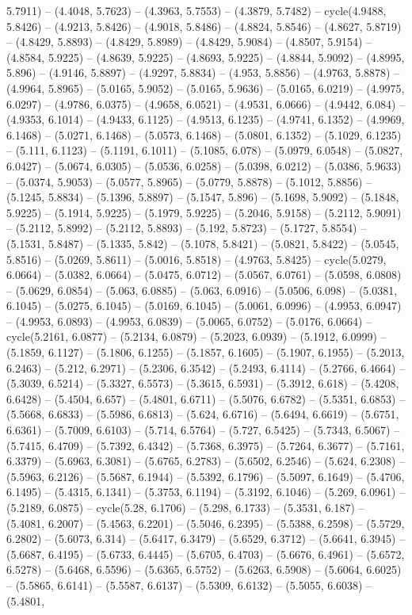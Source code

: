 5.7911) -- (4.4048, 5.7623) -- (4.3963, 5.7553) -- (4.3879, 5.7482) -- cycle(4.9488, 5.8426) -- (4.9213, 5.8426) -- (4.9018, 5.8486) -- (4.8824, 5.8546) -- (4.8627, 5.8719) -- (4.8429, 5.8893) -- (4.8429, 5.8989) -- (4.8429, 5.9084) -- (4.8507, 5.9154) -- (4.8584, 5.9225) -- (4.8639, 5.9225) -- (4.8693, 5.9225) -- (4.8844, 5.9092) -- (4.8995, 5.896) -- (4.9146, 5.8897) -- (4.9297, 5.8834) -- (4.953, 5.8856) -- (4.9763, 5.8878) -- (4.9964, 5.8965) -- (5.0165, 5.9052) -- (5.0165, 5.9636) -- (5.0165, 6.0219) -- (4.9975, 6.0297) -- (4.9786, 6.0375) -- (4.9658, 6.0521) -- (4.9531, 6.0666) -- (4.9442, 6.084) -- (4.9353, 6.1014) -- (4.9433, 6.1125) -- (4.9513, 6.1235) -- (4.9741, 6.1352) -- (4.9969, 6.1468) -- (5.0271, 6.1468) -- (5.0573, 6.1468) -- (5.0801, 6.1352) -- (5.1029, 6.1235) -- (5.111, 6.1123) -- (5.1191, 6.1011) -- (5.1085, 6.078) -- (5.0979, 6.0548) -- (5.0827, 6.0427) -- (5.0674, 6.0305) -- (5.0536, 6.0258) -- (5.0398, 6.0212) -- (5.0386, 5.9633) -- (5.0374, 5.9053) -- (5.0577, 5.8965) -- (5.0779, 5.8878) -- (5.1012, 5.8856) -- (5.1245, 5.8834) -- (5.1396, 5.8897) -- (5.1547, 5.896) -- (5.1698, 5.9092) -- (5.1848, 5.9225) -- (5.1914, 5.9225) -- (5.1979, 5.9225) -- (5.2046, 5.9158) -- (5.2112, 5.9091) -- (5.2112, 5.8992) -- (5.2112, 5.8893) -- (5.192, 5.8723) -- (5.1727, 5.8554) -- (5.1531, 5.8487) -- (5.1335, 5.842) -- (5.1078, 5.8421) -- (5.0821, 5.8422) -- (5.0545, 5.8516) -- (5.0269, 5.8611) -- (5.0016, 5.8518) -- (4.9763, 5.8425) -- cycle(5.0279, 6.0664) -- (5.0382, 6.0664) -- (5.0475, 6.0712) -- (5.0567, 6.0761) -- (5.0598, 6.0808) -- (5.0629, 6.0854) -- (5.063, 6.0885) -- (5.063, 6.0916) -- (5.0506, 6.098) -- (5.0381, 6.1045) -- (5.0275, 6.1045) -- (5.0169, 6.1045) -- (5.0061, 6.0996) -- (4.9953, 6.0947) -- (4.9953, 6.0893) -- (4.9953, 6.0839) -- (5.0065, 6.0752) -- (5.0176, 6.0664) -- cycle(5.2161, 6.0877) -- (5.2134, 6.0879) -- (5.2023, 6.0939) -- (5.1912, 6.0999) -- (5.1859, 6.1127) -- (5.1806, 6.1255) -- (5.1857, 6.1605) -- (5.1907, 6.1955) -- (5.2013, 6.2463) -- (5.212, 6.2971) -- (5.2306, 6.3542) -- (5.2493, 6.4114) -- (5.2766, 6.4664) -- (5.3039, 6.5214) -- (5.3327, 6.5573) -- (5.3615, 6.5931) -- (5.3912, 6.618) -- (5.4208, 6.6428) -- (5.4504, 6.657) -- (5.4801, 6.6711) -- (5.5076, 6.6782) -- (5.5351, 6.6853) -- (5.5668, 6.6833) -- (5.5986, 6.6813) -- (5.624, 6.6716) -- (5.6494, 6.6619) -- (5.6751, 6.6361) -- (5.7009, 6.6103) -- (5.714, 6.5764) -- (5.727, 6.5425) -- (5.7343, 6.5067) -- (5.7415, 6.4709) -- (5.7392, 6.4342) -- (5.7368, 6.3975) -- (5.7264, 6.3677) -- (5.7161, 6.3379) -- (5.6963, 6.3081) -- (5.6765, 6.2783) -- (5.6502, 6.2546) -- (5.624, 6.2308) -- (5.5963, 6.2126) -- (5.5687, 6.1944) -- (5.5392, 6.1796) -- (5.5097, 6.1649) -- (5.4706, 6.1495) -- (5.4315, 6.1341) -- (5.3753, 6.1194) -- (5.3192, 6.1046) -- (5.269, 6.0961) -- (5.2189, 6.0875) -- cycle(5.28, 6.1706) -- (5.298, 6.1733) -- (5.3531, 6.187) -- (5.4081, 6.2007) -- (5.4563, 6.2201) -- (5.5046, 6.2395) -- (5.5388, 6.2598) -- (5.5729, 6.2802) -- (5.6073, 6.314) -- (5.6417, 6.3479) -- (5.6529, 6.3712) -- (5.6641, 6.3945) -- (5.6687, 6.4195) -- (5.6733, 6.4445) -- (5.6705, 6.4703) -- (5.6676, 6.4961) -- (5.6572, 6.5278) -- (5.6468, 6.5596) -- (5.6365, 6.5752) -- (5.6263, 6.5908) -- (5.6064, 6.6025) -- (5.5865, 6.6141) -- (5.5587, 6.6137) -- (5.5309, 6.6132) -- (5.5055, 6.6038) -- (5.4801, 